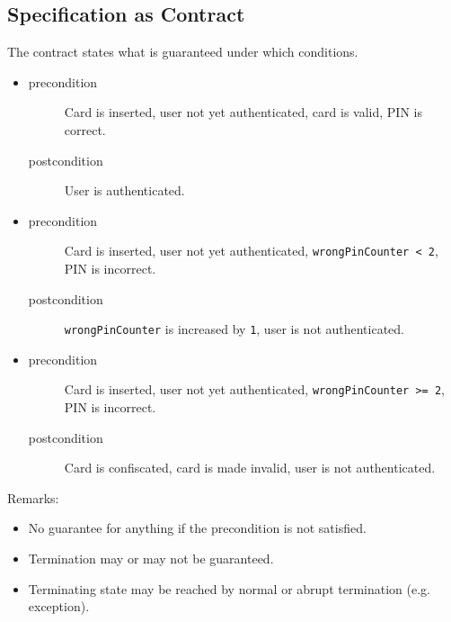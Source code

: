 		\subsection{Specification as Contract}
			The contract states what is guaranteed under which conditions.
			\begin{itemize}
				\item[]
					\begin{description}
						\item[precondition] Card is inserted, user not yet authenticated, card is valid, PIN is correct.
						\item[postcondition] User is authenticated.
					\end{description}
				\item[]
					\begin{description}
						\item[precondition] Card is inserted, user not yet authenticated, \texttt{wrongPinCounter < 2}, PIN is incorrect.
						\item[postcondition] \texttt{wrongPinCounter} is increased by \texttt{1}, user is not authenticated.
					\end{description}
				\item[]
					\begin{description}
						\item[precondition] Card is inserted, user not yet authenticated, \texttt{wrongPinCounter >= 2}, PIN is incorrect.
						\item[postcondition] Card is confiscated, card is made invalid, user is not authenticated.
					\end{description}
			\end{itemize}


			Remarks:
			\begin{itemize}
				\item No guarantee for anything if the precondition is not satisfied.
				\item Termination may or may not be guaranteed.
				\item Terminating state may be reached by normal or abrupt termination (e.g. exception).
			\end{itemize}


